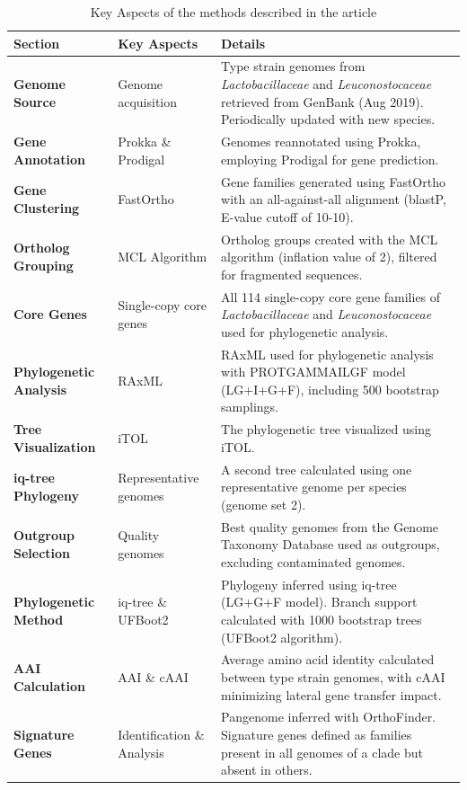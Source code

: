 \begin{table}[ht]
    \centering
    \caption{Key Aspects of the methods described in the article}
    \label{tab:L3-A3-Methods}
    \begin{tabular}{>{\centering\arraybackslash}m{3.5cm}|>{\centering\arraybackslash}m{4.5cm}|p{6cm}}
        \textbf{Section} & \textbf{Key Aspects} & \textbf{Details} \\
        \hline
        \textbf{Genome Source} & Genome acquisition & Type strain genomes from \textit{Lactobacillaceae} and \textit{Leuconostocaceae} retrieved from GenBank (Aug 2019). Periodically updated with new species. \\
        \hline
        \textbf{Gene Annotation} & Prokka \& Prodigal & Genomes reannotated using Prokka, employing Prodigal for gene prediction. \\
        \hline
        \textbf{Gene Clustering} & FastOrtho & Gene families generated using FastOrtho with an all-against-all alignment (blastP, E-value cutoff of 10-10). \\
        \hline
        \textbf{Ortholog Grouping} & MCL Algorithm & Ortholog groups created with the MCL algorithm (inflation value of 2), filtered for fragmented sequences. \\
        \hline
        \textbf{Core Genes} & Single-copy core genes & All 114 single-copy core gene families of \textit{Lactobacillaceae} and \textit{Leuconostocaceae} used for phylogenetic analysis. \\
        \hline
        \textbf{Phylogenetic Analysis} & RAxML & RAxML used for phylogenetic analysis with PROTGAMMAILGF model (LG+I+G+F), including 500 bootstrap samplings. \\
        \hline
        \textbf{Tree Visualization} & iTOL & The phylogenetic tree visualized using iTOL. \\
        \hline
        \textbf{iq-tree Phylogeny} & Representative genomes & A second tree calculated using one representative genome per species (genome set 2). \\
        \hline
        \textbf{Outgroup Selection} & Quality genomes & Best quality genomes from the Genome Taxonomy Database used as outgroups, excluding contaminated genomes. \\
        \hline
        \textbf{Phylogenetic Method} & iq-tree \& UFBoot2 & Phylogeny inferred using iq-tree (LG+G+F model). Branch support calculated with 1000 bootstrap trees (UFBoot2 algorithm). \\
        \hline
        \textbf{AAI Calculation} & AAI \& cAAI & Average amino acid identity calculated between type strain genomes, with cAAI minimizing lateral gene transfer impact. \\
        \hline
        \textbf{Signature Genes} & Identification \& Analysis & Pangenome inferred with OrthoFinder. Signature genes defined as families present in all genomes of a clade but absent in others. \\
    \end{tabular}
\end{table}

